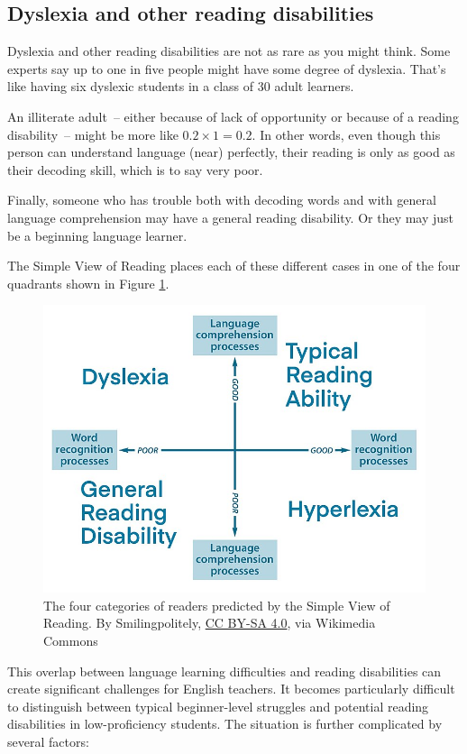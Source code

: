\subsection{Dyslexia and other reading disabilities}

Dyslexia and other reading disabilities are not as rare as you might think. Some experts say up to one in five people might have some degree of dyslexia. That's like having six dyslexic students in a class of 30 adult learners.

An illiterate adult~-- either because of lack of opportunity or because of a reading disability~-- might be more like $0.2\times1=0.2$. In other words, even though this person can understand language (near) perfectly, their reading is only as good as their decoding skill, which is to say very poor.

Finally, someone who has trouble both with decoding words and with general language comprehension may have a general reading disability. Or they may just be a beginning language learner.

The Simple View of Reading places each of these different cases in one of the four quadrants shown in Figure \ref{fig:simple-view-quadrants}.

\begin{figure}
    \centering
    \includegraphics[width=0.8\linewidth]{figures/Simple_View_of_Reading_quadrant_visualisation.jpg}
    \caption{The four categories of readers predicted by the Simple View of Reading. By Smilingpolitely, \href{https://creativecommons.org/licenses/by-sa/4.0}{CC BY-SA 4.0}, via Wikimedia Commons}
    \label{fig:simple-view-quadrants}
\end{figure}

This overlap between language learning difficulties and reading disabilities can create significant challenges for English teachers. It becomes particularly difficult to distinguish between typical beginner-level struggles and potential reading disabilities in low-proficiency students. The situation is further complicated by several factors:

